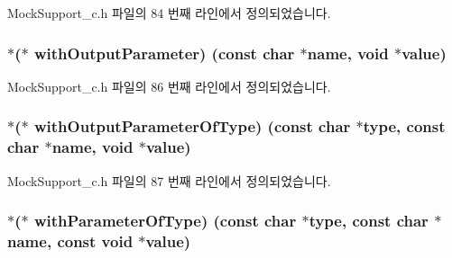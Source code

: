 Mock\+Support\+\_\+c.\+h 파일의 84 번째 라인에서 정의되었습니다.

\subsubsection[{\texorpdfstring{with\+Output\+Parameter}{withOutputParameter}}]{$\ast$($\ast$ with\+Output\+Parameter) (const char $\ast$name, void $\ast$value)}\hypertarget{struct_s_mock_actual_call__c_a602b3352b30a9283388eee451dd0505f}{}\label{struct_s_mock_actual_call__c_a602b3352b30a9283388eee451dd0505f}


Mock\+Support\+\_\+c.\+h 파일의 86 번째 라인에서 정의되었습니다.

\subsubsection[{\texorpdfstring{with\+Output\+Parameter\+Of\+Type}{withOutputParameterOfType}}]{$\ast$($\ast$ with\+Output\+Parameter\+Of\+Type) (const char $\ast$type, const char $\ast$name, void $\ast$value)}\hypertarget{struct_s_mock_actual_call__c_a7a7eeffb2f1674e1545964dc5f1e1df3}{}\label{struct_s_mock_actual_call__c_a7a7eeffb2f1674e1545964dc5f1e1df3}


Mock\+Support\+\_\+c.\+h 파일의 87 번째 라인에서 정의되었습니다.

\subsubsection[{\texorpdfstring{with\+Parameter\+Of\+Type}{withParameterOfType}}]{$\ast$($\ast$ with\+Parameter\+Of\+Type) (const char $\ast$type, const char $\ast$name, const void $\ast$value)}\hypertarget{struct_s_mock_actual_call__c_aa3b457a8fdd51319671889c67166737e}{}\label{struct_s_mock_actual_call__c_aa3b457a8fdd51319671889c67166737e}


